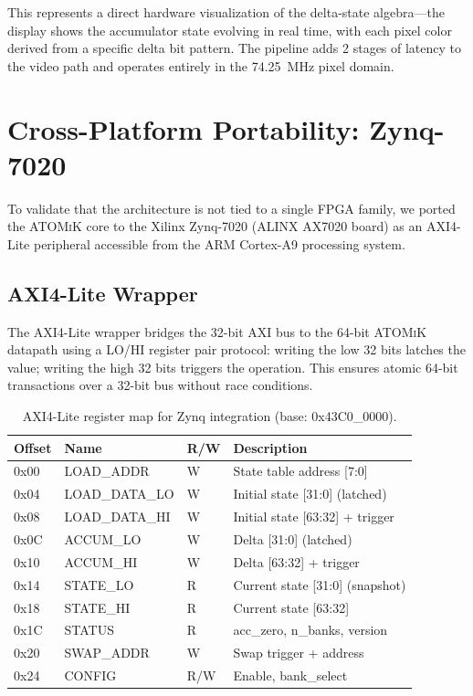\documentclass[11pt,letterpaper]{article}
\theoremstyle{plain}
\theoremstyle{definition}
\theoremstyle{remark}
\newcommand{\atomik}{\textsc{ATOMiK}}
\begin{document}
This represents a direct hardware visualization of the delta-state algebra---the display shows the accumulator state evolving in real time, with each pixel color derived from a specific delta bit pattern. The pipeline adds 2 stages of latency to the video path and operates entirely in the 74.25~MHz pixel domain.

\section{Cross-Platform Portability: Zynq-7020}
\label{sec:zynq}

To validate that the architecture is not tied to a single FPGA family, we ported the \atomik{} core to the Xilinx Zynq-7020 (ALINX AX7020 board) as an AXI4-Lite peripheral accessible from the ARM Cortex-A9 processing system.

\subsection{AXI4-Lite Wrapper}

The AXI4-Lite wrapper bridges the 32-bit AXI bus to the 64-bit \atomik{} datapath using a LO/HI register pair protocol: writing the low 32 bits latches the value; writing the high 32 bits triggers the operation. This ensures atomic 64-bit transactions over a 32-bit bus without race conditions.

\begin{table}[!htbp]
\centering
\caption{AXI4-Lite register map for Zynq integration (base: 0x43C0\_0000).}
\label{tab:axi-regmap}
\begin{tabular}{@{}llll@{}}
\toprule
\textbf{Offset} & \textbf{Name} & \textbf{R/W} & \textbf{Description} \\
\midrule
0x00 & LOAD\_ADDR      & W   & State table address {[}7:0{]} \\
0x04 & LOAD\_DATA\_LO  & W   & Initial state {[}31:0{]} (latched) \\
0x08 & LOAD\_DATA\_HI  & W   & Initial state {[}63:32{]} + trigger \\
0x0C & ACCUM\_LO       & W   & Delta {[}31:0{]} (latched) \\
0x10 & ACCUM\_HI       & W   & Delta {[}63:32{]} + trigger \\
0x14 & STATE\_LO       & R   & Current state {[}31:0{]} (snapshot) \\
0x18 & STATE\_HI       & R   & Current state {[}63:32{]} \\
0x1C & STATUS          & R   & acc\_zero, n\_banks, version \\
0x20 & SWAP\_ADDR      & W   & Swap trigger + address \\
0x24 & CONFIG          & R/W & Enable, bank\_select \\
\bottomrule
\end{tabular}
\end{table}
\end{document}
